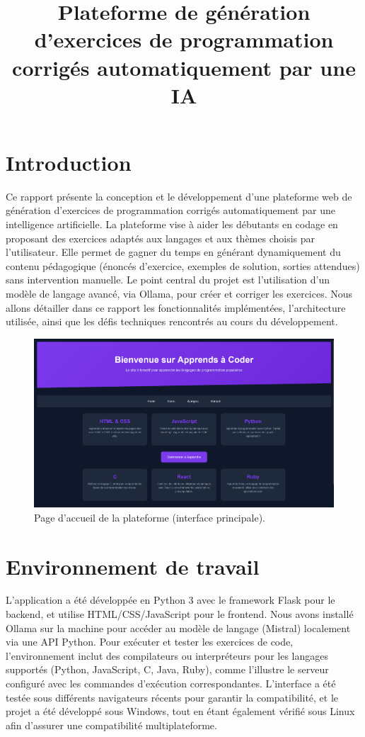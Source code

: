 \documentclass[a4paper, 12pt, twoside]{article}
\title{Plateforme de génération d'exercices de programmation corrigés automatiquement par une IA}
\begin{document}
\pagestyle{empty}
\pagedegarde
\newpage

\tableofcontents
\newpage

\section{Introduction}

Ce rapport présente la conception et le développement d'une plateforme web de génération d'exercices de programmation corrigés automatiquement par une intelligence artificielle. La plateforme vise à aider les débutants en codage en proposant des exercices adaptés aux langages et aux thèmes choisis par l'utilisateur. Elle permet de gagner du temps en générant dynamiquement du contenu pédagogique (énoncés d'exercice, exemples de solution, sorties attendues) sans intervention manuelle. Le point central du projet est l'utilisation d'un modèle de langage avancé, via Ollama, pour créer et corriger les exercices. Nous allons détailler dans ce rapport les fonctionnalités implémentées, l'architecture utilisée, ainsi que les défis techniques rencontrés au cours du développement.

\begin{figure}[h!]
\centering
\includegraphics[width=1.2\textwidth]{pageaccueil.png}
\caption{Page d'accueil de la plateforme (interface principale).}
\label{fig:pageaccueil}
\end{figure}

\section{Environnement de travail}

L'application a été développée en Python 3 avec le framework Flask pour le backend, et utilise HTML/CSS/JavaScript pour le frontend. Nous avons installé Ollama sur la machine pour accéder au modèle de langage (Mistral) localement via une API Python. Pour exécuter et tester les exercices de code, l'environnement inclut des compilateurs ou interpréteurs pour les langages supportés (Python, JavaScript, C, Java, Ruby), comme l'illustre le serveur configuré avec les commandes d'exécution correspondantes. L’interface a été testée sous différents navigateurs récents pour garantir la compatibilité, et le projet a été développé sous Windows, tout en étant également vérifié sous Linux afin d’assurer une compatibilité multiplateforme. 
\end{document}
